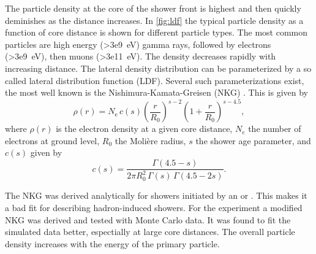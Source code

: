 The particle density at the core of the shower front is highest and then quickly deminishes as the distance increases. In \cref{fig:ldf} the typical particle density as a function of core distance is shown for different particle types. The most common particles are high energy (\SI{>3e9}{\eV}) gamma rays, followed by electrons (\SI{>3e9}{\eV}), then muons (\SI{>3e11}{\eV}). The density decreases rapidly with increasing distance. The lateral density distribution can be parameterized by a so called lateral distribution function (LDF). Several such parameterizations exist, the most well known is the Nishimura-Kamata-Greisen (NKG) \cite{apel2006nkg}. This is given by
%
\begin{equation}
    \label{eq:nkg}
    \rho(r) = N_\mathrm{e}\, c(s) \left(\frac{r}{R_0}\right)^{s - 2} \left(1 +
    \frac{r}{R_0}\right)^{s - 4.5},
\end{equation}
%
where $\rho(r)$ is the electron density at a given core distance, $N_e$ the number of electrons at ground level, $R_0$ the Molière radius, $s$ the shower age parameter, and $c(s)$ given by
%
\begin{equation}
    c(s) = \frac{\Gamma(4.5 - s)}{2\pi R_0^2\, \Gamma(s)\,\Gamma(4.5 - 2s)}.
\end{equation}

The NKG was derived analytically for showers initiated by an \Pelectron or \Pphoton. This makes it a bad fit for describing hadron-induced showers. For the \kascade experiment a modified NKG was derived and tested with Monte Carlo data. It was found to fit the simulated data better, espectially at large core distances. The overall particle density increases with the energy of the primary particle.

